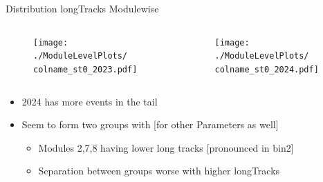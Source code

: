 \begin{frame}{Distribution longTracks Modulewise}
    \newcommand{\colname}{longTracks}
    \begin{columns}
        \begin{column}{0.6\linewidth}
            \begin{figure}
                \centering
                \texttt{[image: ./ModuleLevelPlots/\\colname\_st0\_2023.pdf]}
            \end{figure}
        \end{column}
        \begin{column}{0.6\linewidth}
            \begin{figure}
                \centering
                \texttt{[image: ./ModuleLevelPlots/\\colname\_st0\_2024.pdf]}
            \end{figure}
        \end{column}
    \end{columns}
    \begin{itemize}
        \item 2024 has more events in the tail
        \item Seem to form two groups with [for other Parameters as well]
        \begin{itemize}
            \item Modules 2,7,8 having lower long tracks [pronounced in bin2]
            \item Separation between groups worse with higher longTracks
        \end{itemize}
    \end{itemize}
\end{frame}

